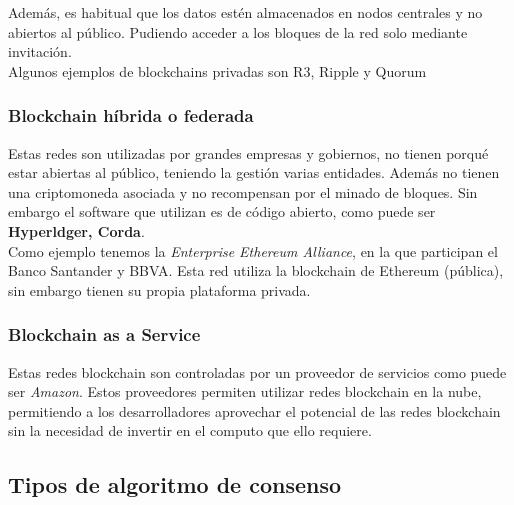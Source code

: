 Además, es habitual que los datos estén almacenados en nodos centrales y no abiertos al público. Pudiendo acceder a los bloques de la red solo mediante invitación. \\

Algunos ejemplos de blockchains privadas son R3\cite{webR3}, Ripple\cite{webRipple} y Quorum\cite{webQuorum}

\subsubsection{Blockchain híbrida o federada}

Estas redes son utilizadas por grandes empresas y gobiernos, no tienen porqué estar abiertas al público, teniendo la gestión varias entidades. Además no tienen una criptomoneda asociada y no recompensan por el minado de bloques. Sin embargo el software que utilizan es de código abierto, como puede ser \textbf{Hyperldger, Corda}\cite{webHyper, webCorda}. \\

Como ejemplo tenemos la \emph{Enterprise Ethereum Alliance}, en la que participan el Banco Santander y BBVA. Esta red utiliza la blockchain de Ethereum (pública), sin embargo tienen su propia plataforma privada.

\subsubsection{Blockchain as a Service}

Estas redes blockchain son controladas por un proveedor de servicios como puede ser \emph{Amazon}. Estos proveedores permiten utilizar redes blockchain en la nube, permitiendo a los desarrolladores aprovechar el potencial de las redes blockchain sin la necesidad de invertir en el computo que ello requiere.

\subsection{Tipos de algoritmo de consenso} \label{sec:Algor}

